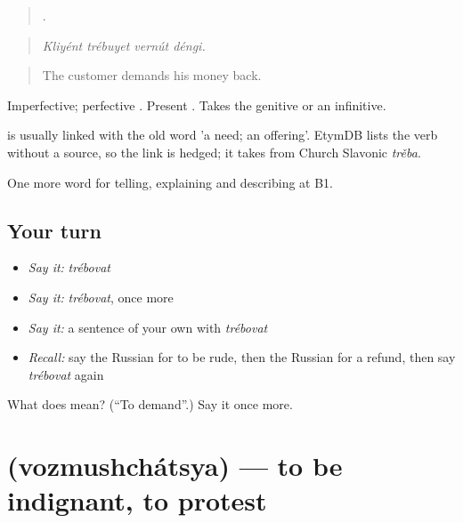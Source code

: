 \begin{quote}
   .
\end{quote}

\begin{quote}
\emph{Kliyént trébuyet vernút déngi.}
\end{quote}

\begin{quote}
The customer demands his money back.
\end{quote}

Imperfective; perfective \emph{}. Present \emph{}. Takes the genitive or an infinitive.

\begin{cousinweb}
\emph{} is usually linked with the old word \emph{} 'a need; an offering'. EtymDB lists the verb without a source, so the link is hedged; it takes \emph{} from Church Slavonic \emph{trěba}.
\end{cousinweb}

\begin{grammarlens}[title={What you've built}]
One more word for telling, explaining and describing at B1.
\end{grammarlens}

\subsection*{Your turn}
\begin{itemize}
\raggedright
  \item \emph{Say it:} \emph{trébovat}
  \item \emph{Say it:} \emph{trébovat}, once more
  \item \emph{Say it:} a sentence of your own with \emph{trébovat}
  \item \emph{Recall:} say the Russian for to be rude, then the Russian for a refund, then say \emph{trébovat} again
\end{itemize}

\begin{tcolorbox}[breakable,colback=teal!4,colframe=teal!35!black,title={Before you move on}]
What does  mean? (\textquotedblleft{}To demand\textquotedblright{}.) Say it once more.
\end{tcolorbox}
\section[\texorpdfstring{\ru{возмущаться} (vozmushchátsya)}{возмущаться (vozmushchátsya)}]{ (vozmushchátsya) — to be indignant, to protest}

